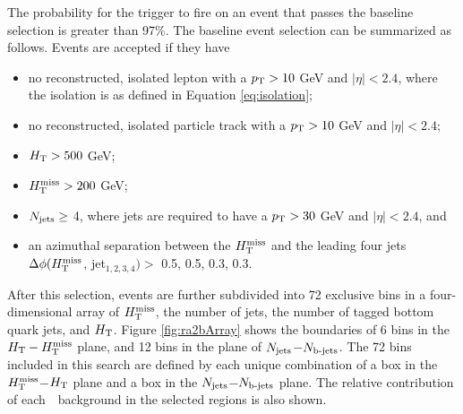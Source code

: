 The probability for the trigger to fire on an event that passes the baseline selection is greater than 97\%. The baseline event selection can be summarized as follows. Events are accepted if they have
\begin{itemize}
\item no reconstructed, isolated lepton with a $p_{\text{T}}>10$ GeV and $|\eta|<2.4$, where the isolation is as defined in Equation \ref{eq:isolation};
\item no reconstructed, isolated particle track with a $p_{\text{T}}>10$ GeV and $|\eta|<2.4$;
\item $H_{\rm T}>500$ GeV;
\item $H_{\text{T}}^{\rm miss}>200$ GeV;
\item $N_{\rm jets}\geq$ 4, where jets are required to have a $p_{\text{T}}>30$ GeV and $|\eta|<2.4$, and
\item an azimuthal separation between the $H_{\text{T}}^{\rm miss}$ and the leading four jets $\Delta\phi(H_{\text{T}}^{\rm miss}$, jet$_{1,2,3,4})>$ 0.5, 0.5, 0.3, 0.3.
\end{itemize}
After this selection, events are further subdivided into 72 exclusive bins
in a four-dimensional array of $H_{\text{T}}^{\rm miss}$,
the number of jets,
the number of tagged bottom quark jets,
and $H_{\rm T}$. Figure \ref{fig:ra2bArray} shows the boundaries of 6 bins in the $H_{\rm T}-H_{\text{T}}^{\rm miss}$ plane, and 12 bins in the plane of $N_{\rm jets}$$-$$N_{\text{b-jets}}$. The 72 bins included in this search are defined by each unique combination of a box in the $H_{\text{T}}^{\rm miss}$$-$$H_{\rm T}$ plane and a box in the $N_{\rm jets}$$-$$N_{\text{b-jets}}$ plane. The relative contribution of each~\sm~background in the selected regions is also shown. 
